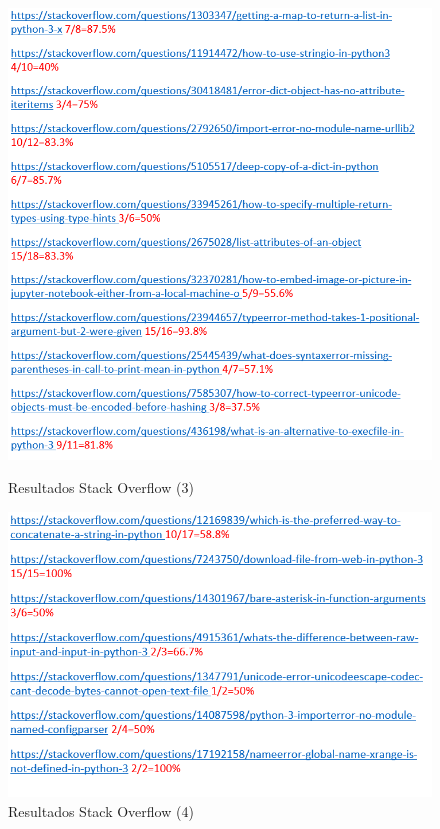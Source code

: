 \documentclass[a4paper, 12pt]{book}
\begin{document}
\begin{figure}
	\centering
    \includegraphics[width=1\textwidth]{img/stack7}
    \label{figura:stack7}
    \caption{Resultados Stack Overflow (3)}
 \end{figure}
 
\begin{figure}
	\centering
    \includegraphics[width=1\textwidth]{img/stack8}
    \caption{Resultados Stack Overflow (4)}
 \end{figure}
 
\end{document}
